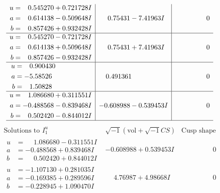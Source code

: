 \documentclass[1p]{elsarticle_modified}
\theoremstyle{definition}
\newcommand{\I}{\sqrt{-1}}
\begin{document}
$$\begin{array}{c|c|c}
\begin{aligned}
u &= \phantom{-}0.545270 + 0.721728 I \\
a &= \phantom{-}0.614138 - 0.509648 I \\
b &= \phantom{-}0.857426 + 0.932428 I\end{aligned}
 & \phantom{-}0.75431 - 7.41963 I & \phantom{-0.000000 } 0 \\ \hline\begin{aligned}
u &= \phantom{-}0.545270 - 0.721728 I \\
a &= \phantom{-}0.614138 + 0.509648 I \\
b &= \phantom{-}0.857426 - 0.932428 I\end{aligned}
 & \phantom{-}0.75431 + 7.41963 I & \phantom{-0.000000 } 0 \\ \hline\begin{aligned}
u &= \phantom{-}0.900430\phantom{ +0.000000I} \\
a &= -5.58526\phantom{ +0.000000I} \\
b &= \phantom{-}1.50828\phantom{ +0.000000I}\end{aligned}
 & \phantom{-}0.491361\phantom{ +0.000000I} & \phantom{-0.000000 } 0 \\ \hline\begin{aligned}
u &= \phantom{-}1.086680 + 0.311551 I \\
a &= -0.488568 - 0.839468 I \\
b &= \phantom{-}0.502420 - 0.844012 I\end{aligned}
 & -0.608988 - 0.539453 I & \phantom{-0.000000 } 0\\
 \hline 
 \end{array}$$\newpage$$\begin{array}{c|c|c}  
\text{Solutions to }I^u_{1}& \I (\text{vol} + \sqrt{-1}CS) & \text{Cusp shape}\\
 \hline 
\begin{aligned}
u &= \phantom{-}1.086680 - 0.311551 I \\
a &= -0.488568 + 0.839468 I \\
b &= \phantom{-}0.502420 + 0.844012 I\end{aligned}
 & -0.608988 + 0.539453 I & \phantom{-0.000000 } 0 \\ \hline\begin{aligned}
u &= -1.107130 + 0.281035 I \\
a &= -0.169385 + 0.289596 I \\
b &= -0.228945 + 1.090470 I\end{aligned}
 & \phantom{-}4.76987 + 4.98668 I & \phantom{-0.000000 } 0 \\ \hline\begin{aligned}

\end{aligned}
\end{array}$$
\end{document}
